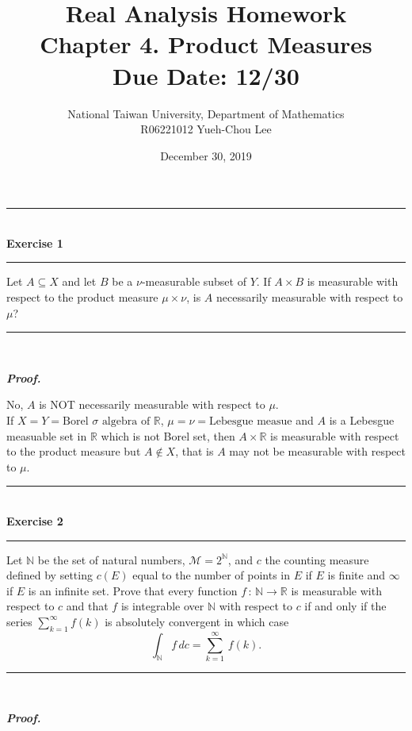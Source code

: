 \documentclass[a4paper,11pt]{article}
\title{Real Analysis Homework\\ Chapter 4. Product Measures\\ Due Date: 12/30}
\author{National Taiwan University, Department of Mathematics\\
R06221012 \hspace{0.2cm} Yueh-Chou Lee}
\date{December 30, 2019}
\begin{document}
\maketitle


\begin{flushleft}
	\rule[-0.5ex]{17cm}{2pt}\\
		\textbf{Exercise 1}\\
	\rule[1.5ex]{17cm}{0.5pt}
		Let $A \subseteq X$ and let $B$ be a $\nu$-measurable subset of $Y$. If $A \times B$ is measurable with respect to the product measure $\mu \times \nu$, is $A$ necessarily measurable with respect to $\mu$?
	\rule[1.0ex]{17cm}{0.5pt}\
\end{flushleft}

\textbf{\textit{Proof.}}

No, $A$ is NOT necessarily measurable with respect to $\mu$.\\

If $X = Y = \text{Borel $\sigma$ algebra of } \mathbb{R}$, $\mu = \nu = \text{Lebesgue measue}$ and $A$ is a Lebesgue measuable set in $\mathbb{R}$ which is not Borel set, then $A \times \mathbb{R}$ is measurable with respect to the product measure but $A \notin X$, that is $A$ may not be measurable with respect to $\mu$.



\begin{flushleft}
	\rule[-0.5ex]{17cm}{2pt}\\
		\textbf{Exercise 2}\\
	\rule[1.5ex]{17cm}{0.5pt}
		Let $\mathbb{N}$ be the set of natural numbers, $\mathcal{M} = 2^{\mathbb{N}}$, and $c$ the counting measure defined by setting $c(E)$ equal to the number of points in $E$ if $E$ is finite and $\infty$ if $E$ is an infinite set. Prove that every function $f\,:\,\mathbb{N} \to \mathbb{R}$ is measurable with respect to $c$ and that $f$ is integrable over $\mathbb{N}$ with respect to $c$ if and only if the series $\sum_{k=1}^\infty f(k)$ is absolutely convergent in which case
			$$\int_{\mathbb{N}} f\,dc = \sum_{k=1}^\infty\,f(k).$$
	\rule[1.0ex]{17cm}{0.5pt}\
\end{flushleft}

\textbf{\textit{Proof.}}

\end{document}
